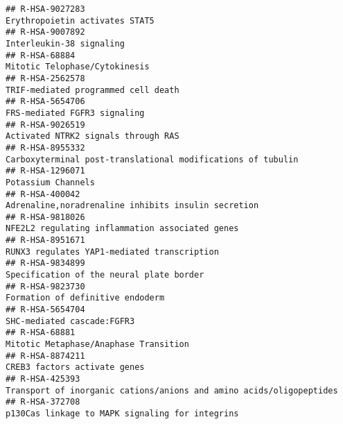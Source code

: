\documentclass[
]{article}
\begin{document}
\begin{verbatim}
## R-HSA-9027283                                                                                                       Erythropoietin activates STAT5
## R-HSA-9007892                                                                                                             Interleukin-38 signaling
## R-HSA-68884                                                                                                          Mitotic Telophase/Cytokinesis
## R-HSA-2562578                                                                                                  TRIF-mediated programmed cell death
## R-HSA-5654706                                                                                                         FRS-mediated FGFR3 signaling
## R-HSA-9026519                                                                                                  Activated NTRK2 signals through RAS
## R-HSA-8955332                                                                          Carboxyterminal post-translational modifications of tubulin
## R-HSA-1296071                                                                                                                   Potassium Channels
## R-HSA-400042                                                                                   Adrenaline,noradrenaline inhibits insulin secretion
## R-HSA-9818026                                                                                      NFE2L2 regulating inflammation associated genes
## R-HSA-8951671                                                                                          RUNX3 regulates YAP1-mediated transcription
## R-HSA-9834899                                                                                             Specification of the neural plate border
## R-HSA-9823730                                                                                                     Formation of definitive endoderm
## R-HSA-5654704                                                                                                           SHC-mediated cascade:FGFR3
## R-HSA-68881                                                                                                  Mitotic Metaphase/Anaphase Transition
## R-HSA-8874211                                                                                                         CREB3 factors activate genes
## R-HSA-425393                                                                   Transport of inorganic cations/anions and amino acids/oligopeptides
## R-HSA-372708                                                                                       p130Cas linkage to MAPK signaling for integrins

\end{verbatim}
\end{document}
